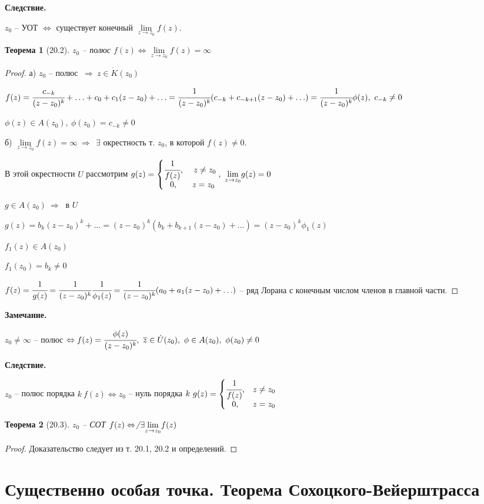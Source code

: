 \documentclass[draft]{article}
\renewcommand{\bf}{\bfseries}
\newcommand{\then}{\ \Rightarrow\ }
\newcommand{\mlim}[1]{\underset{#1}{\lim}}
\newcommand{\LRA}{\Leftrightarrow}
\renewcommand{\bar}{\overline}
\renewcommand{\f}{\phi}
\newcommand{\E}{\ \exists}
\newcommand{\z}{\bar{z}}
\newcommand{\sys}[1]{\left\{\begin{matrix}#1\end{matrix}\right.}
\newtheorem*{theor}{Теорема}
\theoremstyle{remark}
\begin{document}
{\bf Следствие.}

$z_0$ -- УОТ $\LRA$ существует конечный $\mlim{z\to z_0}f(z)$.

\begin{theor}[20.2]
$z_0$ -- полюс $f(z)\LRA\mlim{z\to z_0}f(z)=\infty$
\end{theor}
\begin{proof}
а) $z_0$ -- полюс $\then z\in\dot{K}(z_0)$

$f(z)=\cfrac{c_{-k}}{(z-z_0)^k}+\ldots+c_0+c_1(z-z_0)+\ldots=\cfrac{1}{(z-z_0)^k}(c_{-k}+c_{-k+1}(z-z_0)+\ldots)=\cfrac{1}{(z-z_0)^k}\f(z),\ c_{-k}\neq 0$

$\f(z)\in A(z_0),\ \f(z_0)=c_{-k}\neq0$

б) $\mlim{z\to z_0}f(z)=\infty\then \E$ окрестность т. $z_0$, в которой $f(z)\neq0$.

В этой окрестности $U$ рассмотрим $g(z)=\sys{\cfrac1{f(z)},&\ z\neq z_0 \\ 0, &z=z_0},\ \mlim{z\to z_0} g(z)=0$

$g\in A(z_0)\then$ в $U$

$g(z)=b_k(z-z_0)^k+\ldots=(z-z_0)^k(b_k+b_{k+1}(z-z_0)+\ldots)=(z-z_0)^k\f_1(z)$

$f_1(z)\in A(z_0)$

$f_1(z_0)=b_k\neq 0$

$f(z)=\cfrac{1}{g(z)}=\cfrac1{(z-z_0)^k}\cfrac1{\f_1(z)}=\cfrac1{(z-z_0)^k}(a_0+a_1(z-z_0)+\ldots)$ -- ряд Лорана с конечным числом членов в главной части.
\end{proof}

{\bf Замечание.}

$z_0\neq \infty$ -- полюс $\LRA f(z)=\cfrac{\f(z)}{(z-z_0)^k},\ \z\in \dot{U}(z_0),\ \f\in A(z_0),\ \f(z_0)\neq 0$

{\bf Следствие.}

$z_0$ -- полюс порядка $k\ f(z) \LRA z_0$ -- нуль порядка $k\ g(z)=\sys{\cfrac1{f(z)},&z\neq z_0 \\ 0, &z=z_0}$

\begin{theor}[20.3]
$z_0$ -- СОТ $f(z) \LRA \not\E\mlim{z\to z_0}f(z)$
\end{theor}
\begin{proof}
Доказательство следует из т. 20.1, 20.2 и определений.
\end{proof}

\newpage

\section{Существенно особая точка. Теорема Сохоцкого-Вейерштрасса}
\end{document}
